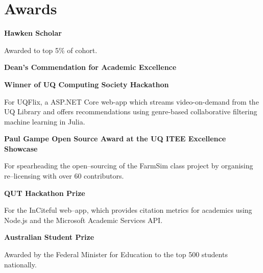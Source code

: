 \documentclass[a4paper]{article}
\renewenvironment{itemize}{
  \begin{list}{}{
    \setlength{\leftmargin}{1.5em}
  }
}{
  \end{list}
}
\newcommand{\dateitem}[1] {\item[\textbf{#1 :}]}
\newlength{\jeroenlen}
\newenvironment{languages}
{\settowidth{\jeroenlen}{\textbf{Languages:}}%
	\begin{description}[leftmargin=\jeroenlen,labelwidth=0pt,labelsep=0pt]
		\item[\textbf{Languages:}]%
		\begin{itemize}[leftmargin=0.5em,labelsep=.5em]}
		{\end{itemize}\end{description}}
\newcommand{\accentcolour}{\color{darkgray}}
\newcommand{\resumesection}[1]{\section*{\accentcolour #1}}
\renewcommand{\accentcolour}{\color{NavyBlue}}
\renewcommand{\resumesection}[1]{\section*{\accentcolour #1}}
\begin{document}

\resumesection{Awards}
\begin{itemize}
	\dateitem{2017 -- 2018} {\textbf{Hawken Scholar}
		
		Awarded to top 5\% of cohort.
	}
	\dateitem{2016 -- 2017} \textbf{Dean's Commendation for Academic Excellence}
	\dateitem{2016} {\textbf{Winner of UQ Computing Society Hackathon}
		
		For UQFlix, a ASP.NET Core web-app which streams video-on-demand from the UQ Library and offers recommendations using genre-based collaborative filtering machine learning in Julia.
	}
	\dateitem{2015} {\textbf{Paul Gampe Open Source Award at the UQ ITEE Excellence Showcase}
		
		For spearheading the open--sourcing of the FarmSim class project by organising re--licensing with over 60 contributors.
	}

	\dateitem{2015} {\textbf{QUT Hackathon Prize}
		
		For the InCiteful web--app, which provides citation metrics for academics using Node.js and the Microsoft Academic Services API.
	}
	\dateitem{2013} {\textbf{Australian Student Prize}
		
		Awarded by the Federal Minister for Education to the top 500 students nationally.
	}
\end{itemize}
\end{document}
